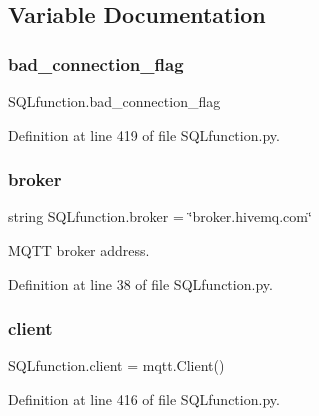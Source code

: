 \subsection{Variable Documentation}
\mbox{\label{namespace_s_q_lfunction_abffdbb58f2363e73ea86ddc83a3893ad}} 
\subsubsection{\texorpdfstring{bad\+\_\+connection\+\_\+flag}{bad\_connection\_flag}}
{\footnotesize\ttfamily S\+Q\+Lfunction.\+bad\+\_\+connection\+\_\+flag}



Definition at line 419 of file S\+Q\+Lfunction.\+py.

\mbox{\label{namespace_s_q_lfunction_aed5ec64d305ca004c4fe54d51dd36a4e}} 
\subsubsection{\texorpdfstring{broker}{broker}}
{\footnotesize\ttfamily string S\+Q\+Lfunction.\+broker = \char`\"{}broker.\+hivemq.\+com\char`\"{}}



M\+Q\+TT broker address. 



Definition at line 38 of file S\+Q\+Lfunction.\+py.

\mbox{\label{namespace_s_q_lfunction_ac9fb782d6f6dcc44fd19ea1b135ab996}} 
\subsubsection{\texorpdfstring{client}{client}}
{\footnotesize\ttfamily S\+Q\+Lfunction.\+client = mqtt.\+Client()}



Definition at line 416 of file S\+Q\+Lfunction.\+py.

